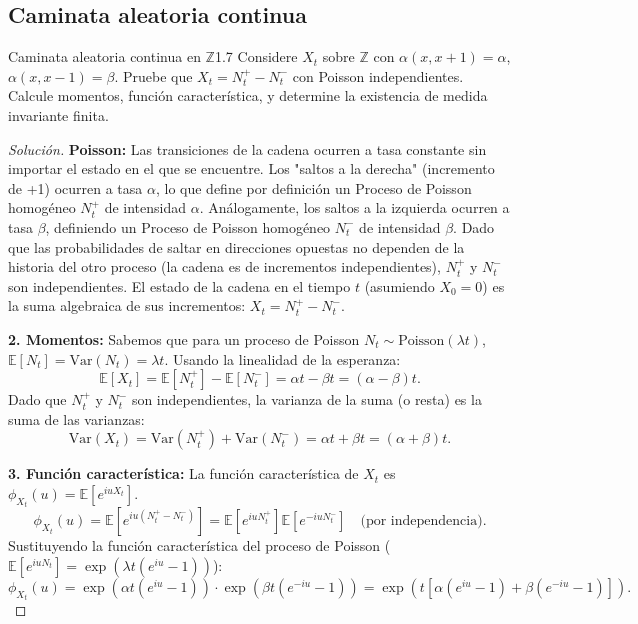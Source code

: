 \documentclass[10pt,a4paper]{article}
\begin{document}
\newpage
\subsection{Caminata aleatoria continua}

\begin{ejercicio}{Caminata aleatoria continua en $\mathbb{Z}$}{1.7}
    Considere $X_t$ sobre $\mathbb{Z}$ con $\alpha(x, x+1) = \alpha$, $\alpha(x, x-1) = \beta$. Pruebe que $X_t = N^+_t - N^-_t$ con Poisson independientes. Calcule momentos, función característica, y determine la existencia de medida invariante finita.
\end{ejercicio}

\begin{proof}[Solución]
    \textbf{Poisson:}
    Las transiciones de la cadena ocurren a tasa constante sin importar el estado en el que se encuentre. Los "saltos a la derecha" (incremento de +1) ocurren a tasa $\alpha$, lo que define por definición un Proceso de Poisson homogéneo $N^+_t$ de intensidad $\alpha$.
    Análogamente, los saltos a la izquierda ocurren a tasa $\beta$, definiendo un Proceso de Poisson homogéneo $N^-_t$ de intensidad $\beta$.
    Dado que las probabilidades de saltar en direcciones opuestas no dependen de la historia del otro proceso (la cadena es de incrementos independientes), $N^+_t$ y $N^-_t$ son independientes. El estado de la cadena en el tiempo $t$ (asumiendo $X_0 = 0$) es la suma algebraica de sus incrementos: $X_t = N^+_t - N^-_t$.

    \textbf{2. Momentos:}
    Sabemos que para un proceso de Poisson $N_t \sim \text{Poisson}(\lambda t)$, $\mathbb{E}[N_t] = \text{Var}(N_t) = \lambda t$.
    Usando la linealidad de la esperanza:
    \[ \mathbb{E}[X_t] = \mathbb{E}[N^+_t] - \mathbb{E}[N^-_t] = \alpha t - \beta t = (\alpha - \beta)t. \]
    Dado que $N^+_t$ y $N^-_t$ son independientes, la varianza de la suma (o resta) es la suma de las varianzas:
    \[ \text{Var}(X_t) = \text{Var}(N^+_t) + \text{Var}(N^-_t) = \alpha t + \beta t = (\alpha + \beta)t. \]

    \textbf{3. Función característica:}
    La función característica de $X_t$ es $\phi_{X_t}(u) = \mathbb{E}[e^{iuX_t}]$.
    \[ \phi_{X_t}(u) = \mathbb{E}[e^{iu(N^+_t - N^-_t)}] = \mathbb{E}[e^{iuN^+_t}] \mathbb{E}[e^{-iuN^-_t}] \quad \text{(por independencia)}. \]
    Sustituyendo la función característica del proceso de Poisson ($\mathbb{E}[e^{iuN_t}] = \exp(\lambda t (e^{iu}-1))$):
    \[ \phi_{X_t}(u) = \exp(\alpha t (e^{iu} - 1)) \cdot \exp(\beta t (e^{-iu} - 1)) = \exp \left( t [\alpha(e^{iu}-1) + \beta(e^{-iu}-1)] \right). \]


\end{proof}
\end{document}
